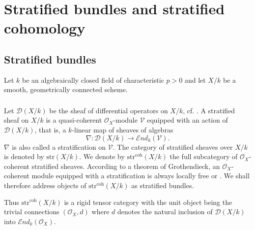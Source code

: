 \documentclass[12pt,a4]{amsart}
\theoremstyle{definition}
\begin{document}
 

 
\section{Stratified bundles and stratified cohomology}
\label{sect_str_bundles}

\subsection{Stratified bundles} 
Let $k$ be an algebraically closed field of characteristic $p>0$ 
and let $X/k$ be a smooth, geometrically connected  scheme. 
\subsubsection{} \label{sect_2.1.1}
Let $\mathcal{D}(X/k)$ be  the sheaf of differential 
operators on $X/k$, cf. \cite[IV.16.8]{EGA4}.
A stratified sheaf on $X/k$ is a quasi-coherent $\mathcal O_X$-module $\mathcal V$ equipped 
with an action of $\mathcal D (X/k)$, that is, a $k$-linear map of sheaves of algebras
$$\nabla:\mathcal D (X/k)\longrightarrow \mathcal{E}\textit{nd}_k(\mathcal V).$$
$\nabla$ is also called a stratification on $\mathcal V$. 
The category of stratified sheaves over $X/k$ is denoted by $\mathrm{str}(X/k).$
We denote by $\mathrm{str}^\mathrm{coh}(X/k)$ the full subcategory of $\mathcal O_X$-coherent
stratified sheaves. According to a theorem of Grothendieck, an $\mathcal O_X$-coherent
module equipped with a stratification is always locally free \cite[Prop.~2.16]{BO78} or \cite[Lemma~6]{dSa07}.  
We shall therefore address objects of $\mathrm{str}^\mathrm{coh}(X/k)$ as stratified bundles. 

Thus $\mathrm{str}^\mathrm{coh}(X/k)$ is a rigid tensor category
with the unit object being the trivial connections $(\mathcal O_X,d)$
where $d$ denotes the natural inclusion of $\mathcal D (X/k)$ into
$\mathcal E\textit{nd}_k(\mathcal O_X).$
\end{document}
